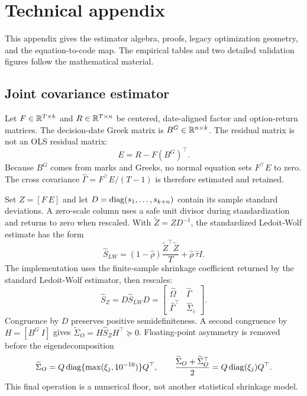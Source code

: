 \section{Technical appendix}

This appendix gives the estimator algebra, proofs, legacy optimization geometry, and the
equation-to-code map. The empirical tables and two detailed validation figures follow the
mathematical material.

\subsection{Joint covariance estimator}\label{app:covariance_proof}

Let \(F\in\mathbb{R}^{T\times k}\) and \(R\in\mathbb{R}^{T\times n}\) be centered, date-aligned factor and
option-return matrices. The decision-date Greek matrix is \(B^G\in\mathbb{R}^{n\times k}\). The
residual matrix is not an OLS residual matrix:
\begin{equation}
  E=R-F(B^G)^\top.
  \label{eq:app_residuals}
\end{equation}
Because \(B^G\) comes from marks and Greeks, no normal equation sets \(F^\top E\) to zero.
The cross covariance \(\widehat\Gamma=F^\top E/(T-1)\) is therefore estimated and retained.

Set \(Z=[F\ E]\) and let \(D=\operatorname{diag}(s_1,\ldots,s_{k+n})\) contain its sample standard
deviations. A zero-scale column uses a safe unit divisor during standardization and
returns to zero when rescaled. With \(\widetilde Z=ZD^{-1}\), the standardized
Ledoit-Wolf estimate has the form
\begin{equation}
  \widehat S_{LW}=(1-\widehat\rho)
  \frac{\widetilde Z^\top\widetilde Z}{T}
  +\widehat\rho\,\widehat\tau I.
  \label{eq:app_lw}
\end{equation}
The implementation uses the finite-sample shrinkage coefficient returned by the standard
Ledoit-Wolf estimator, then rescales:
\begin{equation}
  \widehat S_Z=D\widehat S_{LW}D
  =\begin{bmatrix}
    \widehat\Omega&\widehat\Gamma\\
    \widehat\Gamma^\top&\widehat\Sigma_\varepsilon
  \end{bmatrix}.
  \label{eq:app_rescaled_joint}
\end{equation}
Congruence by \(D\) preserves positive semidefiniteness. A second congruence by
\(H=[B^G\ I]\) gives \(\widetilde\Sigma_O=H\widehat S_ZH^\top\succeq0\). Floating-point
asymmetry is removed before the eigendecomposition
\begin{equation}
  \widehat\Sigma_O=Q\operatorname{diag}\{\max(\xi_j,10^{-10})\}Q^\top,
  \qquad
  \frac{\widetilde\Sigma_O+\widetilde\Sigma_O^\top}{2}
  =Q\operatorname{diag}(\xi_j)Q^\top.
  \label{eq:app_eigen_floor}
\end{equation}
This final operation is a numerical floor, not another statistical shrinkage model.

